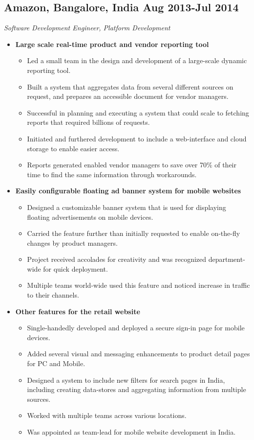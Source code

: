 \documentclass[10pt,letterpaper,sans]{moderncv}        %
\begin{document}
\subsection{Amazon, Bangalore, India \small{Aug 2013-Jul 2014}}
\textit{Software Development Engineer, Platform Development}
\begin{small}
\begin{itemize}

\item \textbf{Large scale real-time product and vendor reporting tool}
\begin{itemize}
\item Led a small team in the design and development of a large-scale dynamic reporting tool.
\item Built a system that aggregates data from several different sources on request, and prepares an accessible document for vendor managers.
\item Successful in planning and executing a system that could scale to fetching reports that required billions of requests.
\item Initiated and furthered development to include a web-interface and cloud storage to enable easier access.
\item Reports generated enabled vendor managers to save over 70\% of their time to find the same information through workarounds.
\end{itemize}

\item \textbf{Easily configurable floating ad banner system for mobile websites}
\begin{itemize}
\item Designed a customizable banner system that is used for displaying floating advertisements on mobile devices.
\item Carried the feature further than initially requested to enable on-the-fly changes by product managers.
\item Project received accolades for creativity and was recognized department-wide for quick deployment.
\item Multiple teams world-wide used this feature and noticed increase in traffic to their channels.
\end{itemize}

\item \textbf{Other features for the retail website}
\begin{itemize}
\item Single-handedly developed and deployed a secure sign-in page for mobile devices.
\item Added several visual and messaging enhancements to product detail pages for PC and Mobile.
\item Designed a system to include new filters for search pages in India, including creating data-stores and aggregating information from multiple sources.
\item Worked with multiple teams across various locations.
\item Was appointed as team-lead for mobile website development in India.
\end{itemize}


\end{itemize}
\end{small}
\end{document}
